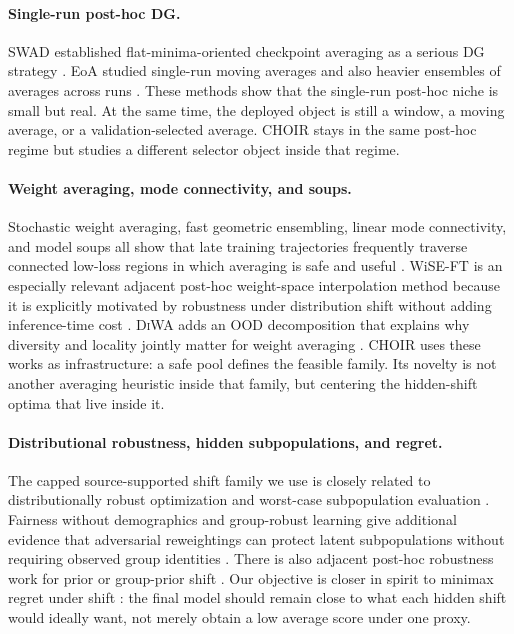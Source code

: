 \documentclass{article}
\newcommand{\ood}{OOD}
\newcommand{\choir}{\textup{\textsc{CHOIR}}}
\newcommand{\swad}{\textup{\textsc{SWAD}}}
\newcommand{\diwa}{\textup{\textsc{DiWA}}}
\begin{document}
\paragraph{Single-run post-hoc DG.}
\swad{} established flat-minima-oriented checkpoint averaging as a serious DG strategy \citep{cha2021swad}. EoA studied single-run moving averages and also heavier ensembles of averages across runs \citep{arpit2021ensemble}. These methods show that the single-run post-hoc niche is small but real. At the same time, the deployed object is still a window, a moving average, or a validation-selected average. \choir{} stays in the same post-hoc regime but studies a different selector object inside that regime.

\paragraph{Weight averaging, mode connectivity, and soups.}
Stochastic weight averaging, fast geometric ensembling, linear mode connectivity, and model soups all show that late training trajectories frequently traverse connected low-loss regions in which averaging is safe and useful \citep{izmailov2018swa,garipov2018fge,frankle2020linear,wortsman2022soups}. WiSE-FT is an especially relevant adjacent post-hoc weight-space interpolation method because it is explicitly motivated by robustness under distribution shift without adding inference-time cost \citep{wortsman2022wiseft}. \diwa{} adds an \ood{} decomposition that explains why diversity and locality jointly matter for weight averaging \citep{rame2022diwa}. \choir{} uses these works as infrastructure: a safe pool defines the feasible family. Its novelty is not another averaging heuristic inside that family, but centering the hidden-shift optima that live inside it.

\paragraph{Distributional robustness, hidden subpopulations, and regret.}
The capped source-supported shift family we use is closely related to distributionally robust optimization and worst-case subpopulation evaluation \citep{duchi2016fdiv,duchi2021learning,li2021worstcase}. Fairness without demographics and group-robust learning give additional evidence that adversarial reweightings can protect latent subpopulations without requiring observed group identities \citep{hashimoto2018fairness,lahoti2020fairness,sagawa2020groupdro}. There is also adjacent post-hoc robustness work for prior or group-prior shift \citep{wei2023priorshift}. Our objective is closer in spirit to minimax regret under shift \citep{agarwal2022mro}: the final model should remain close to what each hidden shift would ideally want, not merely obtain a low average score under one proxy.
\end{document}
